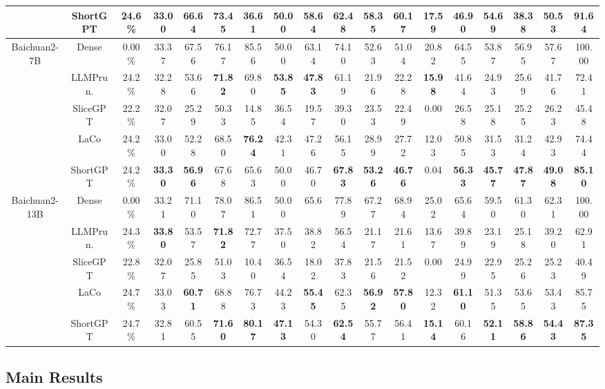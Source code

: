 \begin{table}[t]
\begin{tabular}{c|c|c|ccccccccccccc|cc}
				& ShortGPT  &24.6\%&33.00	&66.64&	73.45&	36.61	&50.00		&\textbf{58.64}&	62.48	&\textbf{58.35}	&\textbf{60.17}&	17.59	&\textbf{46.90}&\textbf{54.69}	&\textbf{38.38}&\textbf{50.53}& \textbf{91.64} \\
				\hline
				\multirow{5}{*}{Baichuan2-7B} & Dense &0.00\%&33.37 &67.56	&76.17	&85.56	&50.00	 &63.14 &74.10 &52.63	&51.04	 &20.82	&64.55& 53.87	& 56.95 &57.67&100.00 \\
				& LLMPrun. &24.2\%&32.28 &53.66 &\textbf{71.82} &69.80 &\textbf{53.85} &\textbf{47.83} &61.19 &21.96 &22.28 &\textbf{15.98} &41.64 &  24.93 & 25.69 &41.76& 72.41 \\
				& SliceGPT &22.2\%&32.07 &25.29 &50.33 &14.85 &36.54  &19.57 &39.30 &23.53 &22.49 &0.00 &26.58&  25.18 &25.25&26.23&45.48 \\
				& LaCo &24.2\%&33.00 &52.28 &68.50 &\textbf{76.24} &42.31 &47.26 &56.15 &28.99 &27.72 &12.03 &50.85& 31.53 &31.24&42.93 & 74.44 \\
				& ShortGPT &24.2\%&\textbf{33.30} 	&\textbf{56.96}	&67.68	&65.63	&50.00	 &46.70 &\textbf{67.83} &\textbf{53.26} &\textbf{46.76}&0.04 &\textbf{56.33}& \textbf{45.77} &	\textbf{47.87} &\textbf{49.08}&\textbf{85.10} \\
				\hline
				\multirow{5}{*}{Baichuan2-13B} & Dense&0.00\%& 33.21 	&71.10	&78.07	&86.51	&50.00 &65.6 &77.89 &67.27	&68.94	 &25.02	&65.64 &  59.50 &61.30&62.31&100.00   \\
				& LLMPrun. &24.3\%&\textbf{33.80} &53.57 &\textbf{71.82} &72.77 &37.50  &38.82 &56.54 &21.17 &21.61 &13.67 &39.89&  23.19 & 25.18&39.20&62.91 \\
				& SliceGPT &22.8\%&32.07 &25.85 &51.03 &10.40 &36.54  &18.02 &37.83 &21.56 &21.52 &0.00 &24.99&  22.95 & 25.26&25.23& 40.49\\
				& LaCo &24.7\%&33.03 &\textbf{60.71} &68.88 &76.73 &44.23  &\textbf{55.45} &62.35  &\textbf{56.92} &\textbf{57.80} &12.32 &\textbf{61.10}&  51.35 & 53.65&53.43& 85.75 \\
				& ShortGPT &24.7\%&32.81 	&60.55	&\textbf{71.60}	&\textbf{80.17}	&\textbf{47.13}	 &54.30 &\textbf{62.54} &55.77	&56.41	 &\textbf{15.14}		&60.16 &\textbf{52.11}   &\textbf{58.86} &\textbf{54.43}&\textbf{87.35} \\
				\hline
				\hline
			\end{tabular}
			
		\end{table}
		
		\subsection{Main Results}
		
